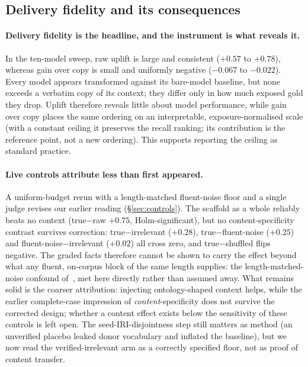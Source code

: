 \documentclass[10pt,twocolumn]{article}
\begin{document}
\subsection{Delivery fidelity and its consequences}
\paragraph{Delivery fidelity is the headline, and the instrument is what reveals it.} In the ten-model sweep, raw uplift is large and consistent ($+0.57$ to $+0.78$), whereas gain over copy is small and uniformly negative ($-0.067$ to $-0.022$). Every model appears transformed against its bare-model baseline, but none exceeds a verbatim copy of its context; they differ only in how much exposed gold they drop. Uplift therefore reveals little about model performance, while gain over copy places the same ordering on an interpretable, exposure-normalised scale (with a constant ceiling it preserves the recall ranking; its contribution is the reference point, not a new ordering). This supports reporting the ceiling as standard practice.

\paragraph{Live controls attribute less than first appeared.} A uniform-budget rerun with a length-matched fluent-noise floor and a single judge revises our earlier reading (\S\ref{sec:controls}). The scaffold as a whole reliably beats no context (true$-$raw $+0.75$, Holm-significant), but no content-specificity contrast survives correction: true$-$irrelevant ($+0.28$), true$-$fluent-noise ($+0.25$) and fluent-noise$-$irrelevant ($+0.02$) all cross zero, and true$-$shuffled flips negative. The graded facts therefore cannot be shown to carry the effect beyond what any fluent, on-corpus block of the same length supplies: the length-matched-noise confound of~\textcite{cuconasu2024poweofnoise}, met here directly rather than assumed away. What remains solid is the coarser attribution: injecting ontology-shaped context helps, while the earlier complete-case impression of \emph{content}-specificity does not survive the corrected design; whether a content effect exists below the sensitivity of these controls is left open. The seed-IRI-disjointness step still matters as method (an unverified placebo leaked donor vocabulary and inflated the baseline), but we now read the verified-irrelevant arm as a correctly specified floor, not as proof of content transfer.
\end{document}
